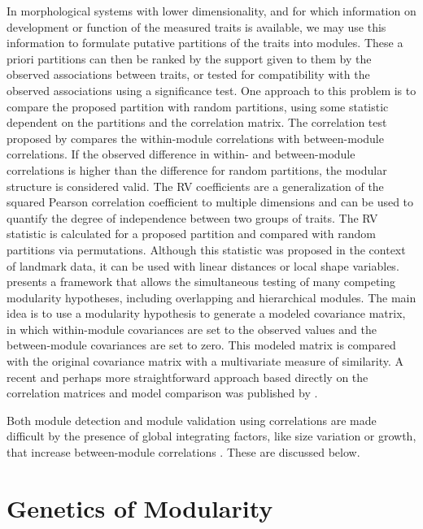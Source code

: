 \begin{refsection}
In morphological systems with lower dimensionality, and for which
information on development or function of the measured traits is
available, we may use this information to formulate putative partitions
of the traits into modules. These a priori partitions can then be ranked
by the support given to them by the observed associations between
traits, or tested for compatibility with the observed associations using
a significance test. One approach to this problem is to compare the
proposed partition with random partitions, using some statistic
dependent on the partitions and the correlation matrix. The correlation
test proposed by \textcite{Cheverud1989-ul}
compares the within-module correlations with between-module
correlations. If the observed difference in within- and between-module
correlations is higher than the difference for random partitions, the
modular structure is considered valid. The RV coefficients
\parencite{Klingenberg2009-rq} are a
generalization of the squared Pearson correlation coefficient to
multiple dimensions and can be used to quantify the degree of
independence between two groups of traits. The RV statistic is
calculated for a proposed partition and compared with random partitions
via permutations. Although this statistic was proposed in the context of
landmark data, it can be used with linear distances or local shape
variables. \textcite{Marquez2008-rh} presents a
framework that allows the simultaneous testing of many competing
modularity hypotheses, including overlapping and hierarchical modules.
The main idea is to use a modularity hypothesis to generate a modeled
covariance matrix, in which within-module covariances are set to the
observed values and the between-module covariances are set to zero. This
modeled matrix is compared with the original covariance matrix with a
multivariate measure of similarity. A recent and perhaps more
straightforward approach based directly on the correlation matrices and
model comparison was published by \textcite{Goswami2016-ml}.

Both module detection and module validation using correlations are made
difficult by the presence of global integrating factors, like size
variation or growth, that increase between-module correlations \parencite{Mitteroecker2007-xq, Porto2013-dc}. These are discussed below.

\section{Genetics of Modularity}


\end{refsection}
